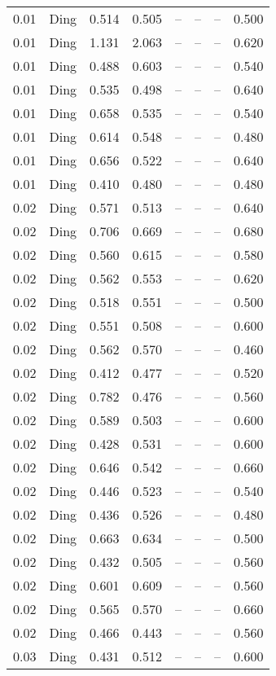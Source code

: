 \begin{table}[H]
\begin{tabular}{l c l l l}
0.01 & Ding & 0.514 & 0.505 & -- & -- & -- & 0.500 \\
0.01 & Ding & 1.131 & 2.063 & -- & -- & -- & 0.620 \\
0.01 & Ding & 0.488 & 0.603 & -- & -- & -- & 0.540 \\
0.01 & Ding & 0.535 & 0.498 & -- & -- & -- & 0.640 \\
0.01 & Ding & 0.658 & 0.535 & -- & -- & -- & 0.540 \\
0.01 & Ding & 0.614 & 0.548 & -- & -- & -- & 0.480 \\
0.01 & Ding & 0.656 & 0.522 & -- & -- & -- & 0.640 \\
0.01 & Ding & 0.410 & 0.480 & -- & -- & -- & 0.480 \\
0.02 & Ding & 0.571 & 0.513 & -- & -- & -- & 0.640 \\
0.02 & Ding & 0.706 & 0.669 & -- & -- & -- & 0.680 \\
0.02 & Ding & 0.560 & 0.615 & -- & -- & -- & 0.580 \\
0.02 & Ding & 0.562 & 0.553 & -- & -- & -- & 0.620 \\
0.02 & Ding & 0.518 & 0.551 & -- & -- & -- & 0.500 \\
0.02 & Ding & 0.551 & 0.508 & -- & -- & -- & 0.600 \\
0.02 & Ding & 0.562 & 0.570 & -- & -- & -- & 0.460 \\
0.02 & Ding & 0.412 & 0.477 & -- & -- & -- & 0.520 \\
0.02 & Ding & 0.782 & 0.476 & -- & -- & -- & 0.560 \\
0.02 & Ding & 0.589 & 0.503 & -- & -- & -- & 0.600 \\
0.02 & Ding & 0.428 & 0.531 & -- & -- & -- & 0.600 \\
0.02 & Ding & 0.646 & 0.542 & -- & -- & -- & 0.660 \\
0.02 & Ding & 0.446 & 0.523 & -- & -- & -- & 0.540 \\
0.02 & Ding & 0.436 & 0.526 & -- & -- & -- & 0.480 \\
0.02 & Ding & 0.663 & 0.634 & -- & -- & -- & 0.500 \\
0.02 & Ding & 0.432 & 0.505 & -- & -- & -- & 0.560 \\
0.02 & Ding & 0.601 & 0.609 & -- & -- & -- & 0.560 \\
0.02 & Ding & 0.565 & 0.570 & -- & -- & -- & 0.660 \\
0.02 & Ding & 0.466 & 0.443 & -- & -- & -- & 0.560 \\
0.03 & Ding & 0.431 & 0.512 & -- & -- & -- & 0.600 \\

\end{tabular}
\end{table}
